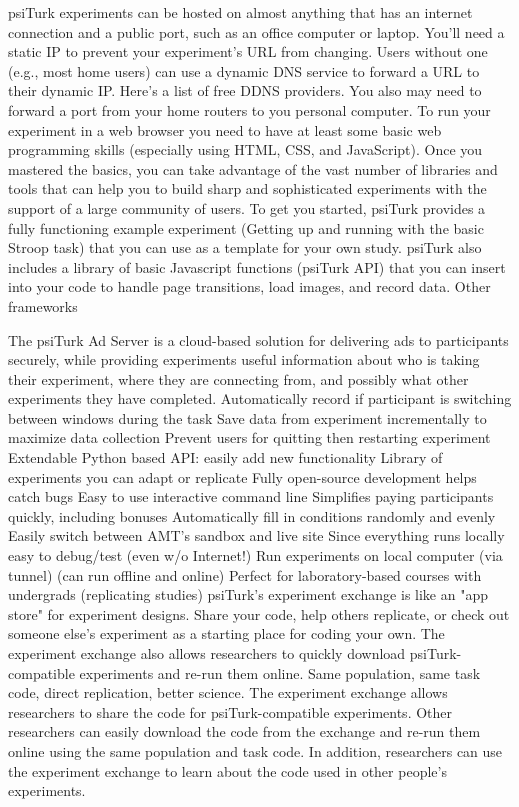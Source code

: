 \documentclass[jou,apacite]{apa6}
\begin{document}
psiTurk experiments can be hosted on almost anything that has an internet connection and a public port, such as an office computer or laptop.
You'll need a static IP to prevent your experiment's URL from changing. 
Users without one (e.g., most home users) can use a dynamic DNS service to forward a URL to their dynamic IP.
Here's a list of free DDNS providers.
You also may need to forward a port from your home routers to you personal computer.
To run your experiment in a web browser you need to have at least some basic web programming skills (especially using HTML, CSS, and JavaScript).
Once you mastered the basics, you can take advantage of the vast number of libraries and tools that can help you to build sharp and sophisticated experiments with the support of a large community of users.
To get you started, psiTurk provides a fully functioning example experiment (Getting up and running with the basic Stroop task) that you can use as a template for your own study.
psiTurk also includes a library of basic Javascript functions (psiTurk API) that you can insert into your code to handle page transitions, load images, and record data.
Other frameworks 

The psiTurk Ad Server is a cloud-based solution for delivering ads to participants securely, while providing experiments useful information about who is taking their experiment, where they are connecting from, and possibly what other experiments they have completed.
Automatically record if participant is switching between windows during the task
Save data from experiment incrementally to maximize data collection
Prevent users for quitting then restarting experiment
Extendable Python based API: easily add new functionality
Library of experiments you can adapt or replicate
Fully open-source development helps catch bugs
Easy to use interactive command line
Simplifies paying participants quickly, including bonuses
Automatically fill in conditions randomly and evenly
Easily switch between AMT's sandbox and live site
Since everything runs locally easy to debug/test (even w/o Internet!)
Run experiments on local computer (via tunnel) (can run offline and online)
Perfect for laboratory-based courses with undergrads (replicating studies)
psiTurk's experiment exchange is like an "app store" for experiment designs. Share your code, help others replicate, or check out someone else's experiment as a starting place for coding your own. The experiment exchange also allows researchers to quickly download psiTurk-compatible experiments and re-run them online. Same population, same task code, direct replication, better science.
The experiment exchange allows researchers to share the code for psiTurk-compatible experiments. Other researchers can easily download the code from the exchange and re-run them online using the same population and task code. In addition, researchers can use the experiment exchange to learn about the code used in other people's experiments. 
\end{document}
